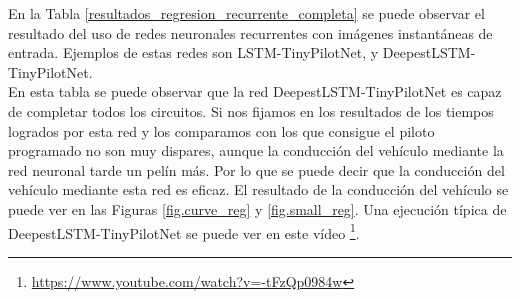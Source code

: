 En la Tabla \ref{resultados_regresion_recurrente_completa} se puede observar el resultado del uso de redes neuronales recurrentes con imágenes instantáneas de entrada. Ejemplos de estas redes son LSTM-TinyPilotNet, y DeepestLSTM-TinyPilotNet.\\

En esta tabla se puede observar que la red DeepestLSTM-TinyPilotNet es capaz de completar todos los circuitos. Si nos fijamos en los resultados de los tiempos logrados por esta red y los comparamos con los que consigue el piloto programado no son muy dispares, aunque la conducción del vehículo mediante la red neuronal tarde un pelín más. Por lo que se puede decir que la conducción del vehículo mediante esta red es eficaz. El resultado de la conducción del vehículo se puede ver en las Figuras \ref{fig.curve_reg} y \ref{fig.small_reg}. Una ejecución típica de DeepestLSTM-TinyPilotNet se puede ver en este vídeo  \footnote{\url{https://www.youtube.com/watch?v=-tFzQp0984w}}.\\

